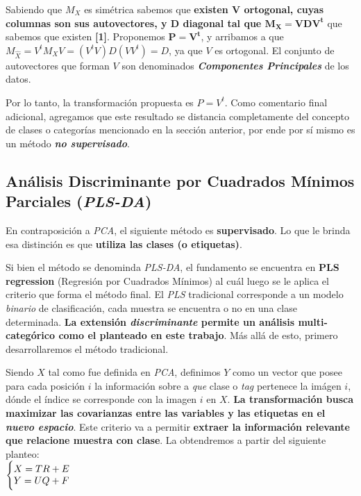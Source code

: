 Sabiendo que $M_{X}$ es sim\'etrica sabemos que \textbf{existen $\mathbf{V}$ ortogonal, cuyas columnas son sus autovectores, y $\mathbf{D}$ diagonal tal que $\mathbf{M_{X} = VDV^{t}}$} que sabemos que existen \textbf{[1]}. Proponemos $\mathbf{P = V^{t}}$, y arribamos a que $M_{\hat{X}} = V^{t}M_{X}V = (V^{t}V)D(VV^{t}) = D$, ya que $V$ es ortogonal. El conjunto de autovectores que forman $V$ son denominados \textbf{\textit{Componentes Principales}} de los datos.

Por lo tanto, la transformaci\'on propuesta es $P = V^{t}$. Como comentario final adicional, agregamos que este resultado se distancia completamente del concepto de clases o categor\'ias mencionado en la secci\'on anterior, por ende por s\'i mismo es un m\'etodo \textbf{\textit{no supervisado}}.

\subsection{An\'alisis Discriminante por Cuadrados M\'inimos Parciales (\textit{PLS-DA})}\label{intro_PLSDA}

En contraposici\'on a \textit{PCA}, el siguiente m\'etodo es \textbf{supervisado}. Lo que le brinda esa distinci\'on es que \textbf{utiliza las clases (o etiquetas)}.

Si bien el m\'etodo se denominda \textit{PLS-DA}, el fundamento se encuentra en \textbf{PLS regression} (Regresi\'on por Cuadrados M\'inimos) al cu\'al luego se le aplica el criterio que forma el m\'etodo final. El \textit{PLS} tradicional corresponde a un modelo \textit{binario} de clasificaci\'on, cada muestra se encuentra o no en una clase determinada. \textbf{La extensi\'on \textit{discriminante} permite un an\'alisis multi-categ\'orico como el planteado en este trabajo}. M\'as all\'a de esto, primero desarrollaremos el m\'etodo tradicional.

Siendo $X$ tal como fue definida en \textit{PCA}, definimos $Y$ como un vector que posee para cada posici\'on $i$ la informaci\'on sobre a \textit{que} clase o \textit{tag} pertenece la im\'agen $i$, d\'onde el \'indice se corresponde con la imagen $i$ en $X$. \textbf{La transformaci\'on busca maximizar las covarianzas entre las variables y las etiquetas en el \textit{nuevo espacio}}. Este criterio va a permitir \textbf{extraer la informaci\'on relevante que relacione muestra con clase}. La obtendremos a partir del siguiente planteo: \\

$\Bigg\{
\begin{array}{@{}ll@{}}
	X = TR + E \\
	Y = UQ + F
\end{array}$ \\

